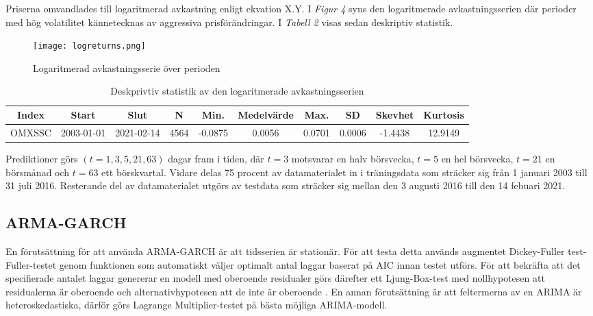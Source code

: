 \documentclass[11pt]{article}
\begin{document}
Priserna omvandlades till logaritmerad avkastning enligt ekvation X.Y. I \emph{Figur 4} syns den logaritmerade avkastningsserien där perioder med hög volatilitet kännetecknas av aggressiva prisförändringar. I \emph{Tabell 2} visas sedan deskriptiv statistik. 

\begin{figure}[H]
\caption{Logaritmerad avkastningsserie över perioden}
\texttt{[image: logreturns.png]}
\centering
\end{figure}

\begin{table}[H]
\caption{Deskprivtiv statistik av den logaritmerade avkastningsserien}
\begin{adjustbox}{width=1\textwidth}
\begin{tabular}{|c|c|c|c|c|c|c|c|c|c|}
\hline
Index & Start & Slut & N & Min. & Medelvärde & Max. & SD & Skevhet & Kurtosis \\ \hline
OMXSSC   & 2003-01-01 & 2021-02-14 & 4564 & -0.0875 & 0.0056 & 0.0701 & 0.0006 & -1.4438 & 12.9149 \\ \hline
\end{tabular}
\end{adjustbox}
\end{table}


Prediktioner görs $(t=1, 3, 5, 21, 63)$ dagar fram i tiden, där $t=3$ motsvarar en halv börsvecka, $t=5$ en hel börsvecka, $t=21$ en börsmånad och $t=63$ ett börskvartal. Vidare delas 75 procent av datamaterialet in i träningsdata som sträcker sig från 1 januari 2003 till 31 juli 2016. Resterande del av datamaterialet utgörs av testdata som sträcker sig mellan den 3 augusti 2016 till den 14 febuari 2021. 

\subsection{ARMA-GARCH}
En förutsättning för att använda ARMA-GARCH är att tidsserien är stationär. För att testa detta används augmentet Dickey-Fuller test-Fuller-testet genom funktionen som automatiskt väljer optimalt antal laggar baserat på AIC innan testet utförs. För att bekräfta att det specifierade antalet laggar genererar en modell med oberoende residualer görs därefter ett Ljung-Box-test med nollhypotesen att residualerna är oberoende och alternativhypotesen att de inte är oberoende \parencite{box1970distribution}. En annan förutsättning är att feltermerna av en ARIMA är heteroskedastiska, därför görs Lagrange Multiplier-testet på bästa möjliga ARIMA-modell.
\end{document}
